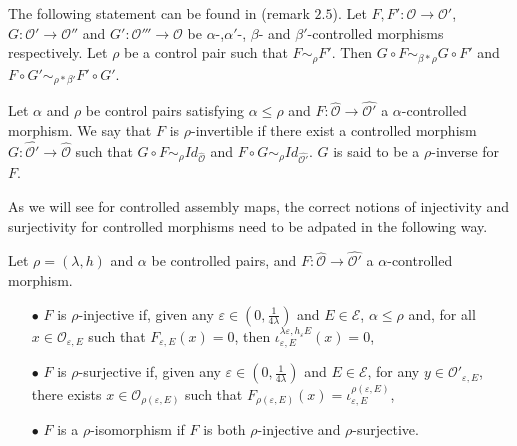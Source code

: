 \begin{rk} \label{rk2.5} The following statement can be found in \cite{OY2} (remark $2.5$). Let $F,F' : \mathcal O\rightarrow \mathcal O'$, $G: \mathcal O'\rightarrow \mathcal O''$ and $G': \mathcal O'''\rightarrow \mathcal O$ be $\alpha$-,$\alpha'$-, $\beta$- and $\beta'$-controlled morphisms respectively. Let $\rho $ be a control pair such that $F\sim_\rho F'$. Then $G\circ F \sim_{\beta\ast\rho}  G\circ F'$ and $F\circ G'\sim_{\rho \ast \beta'} F'\circ G'$.
\end{rk}

\begin{definition}
Let $\alpha$ and $\rho$ be control pairs satisfying $\alpha \leq \rho$ and $F : \hat{\mathcal O} \rightarrow \hat{\mathcal O'}$ a $\alpha$-controlled morphism. We say that $F$ is $\rho$-invertible if there exist a controlled morphism $ G : \hat{\mathcal O'} \rightarrow \hat{\mathcal O}$ such that $G \circ F \sim_\rho Id_{\hat{\mathcal O}}$ and $F\circ G \sim_\rho Id_{\hat{\mathcal O'}}$. $G$ is said to be a $\rho$-inverse for $F$.
\end{definition}

As we will see for controlled assembly maps, the correct notions of injectivity and surjectivity for controlled morphisms need to be adpated in the following way.\\

\begin{definition}
Let $\rho=(\lambda,h)$ and $\alpha$ be controlled pairs, and $F : \hat{\mathcal O} \rightarrow \hat{\mathcal O'}$ a $\alpha$-controlled morphism. 
\begin{itemize}
\item[$\bullet$] $F$ is $\rho$-injective if, given any $\varepsilon \in (0,\frac{1}{4\lambda})$ and $E\in \mathcal E$, $\alpha\leq \rho$ and, for all $x\in \mathcal O_{\varepsilon, E}$ such that $F_{\varepsilon, E}(x)=0$, then $\iota_{\varepsilon, E}^{\lambda\varepsilon, h_\varepsilon E}(x)=0$,
\item[$\bullet$] $F$ is $\rho$-surjective if, given any $\varepsilon \in (0,\frac{1}{4\lambda})$ and $E\in \mathcal E$, for any $y\in \mathcal O' _{\varepsilon, E}$, there exists $x\in \mathcal O_{\rho(\varepsilon,E)}$ such that $F_{\rho(\varepsilon,E)}(x)= \iota_{\varepsilon,E}^{\rho(\varepsilon,E)}$,
\item[$\bullet$] $F$ is a $\rho$-isomorphism if $F$ is both $\rho$-injective and $\rho$-surjective.
\end{itemize}
\end{definition}

